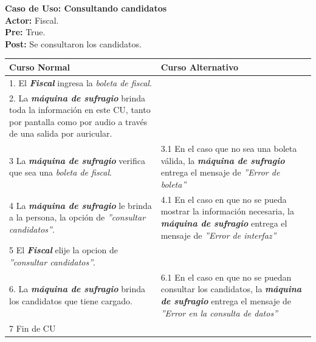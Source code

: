 \documentclass[spanish, 10pt,a4paper]{article}
\numberwithin{equation}{section} %
\begin{document}
\noindent\textbf{Caso de Uso: Consultando candidatos}\\
\textbf{Actor: } Fiscal.\\
\textbf{Pre: } True.\\
\textbf{Post: } Se consultaron los candidatos.\\
\begin{table}[H]
  \centering
\bgroup
\def\arraystretch{1.3}
  \begin{tabular}{p{9cm} | p{7cm}}
    \hline
    Curso Normal & Curso Alternativo \\
    \hline
    \hline    
    1. El \textbf{\textit{Fiscal}} ingresa la \textit{boleta de fiscal}. 
    & \\
    
    \hline
    2. La \textbf{\textit{máquina de sufragio}} brinda toda la información en este CU, tanto por pantalla como por audio a través de una salida por auricular.
    &
    \\
    
    \hline
    3 La \textbf{\textit{máquina de sufragio}} verifica que sea una \textit{boleta de fiscal}.
    & 
    3.1 En el caso que no sea una boleta válida, la \textbf{\textit{máquina de sufragio}} entrega el mensaje de \textit{''Error de boleta''}
    \\
    
    \hline
    4 La \textbf{\textit{máquina de sufragio}} le brinda a la persona, la opción de \textit{''consultar candidatos''}.
    & 
    4.1 En el caso en que no se pueda mostrar la información necesaria, la \textbf{\textit{máquina de sufragio}} entrega el mensaje de \textit{''Error de interfaz''}
    \\
    
    \hline
    5 El \textbf{\textit{Fiscal}} elije la opcion de \textit{''consultar candidatos''}.
    & \\
    
    \hline
    6. La \textbf{\textit{máquina de sufragio}} brinda los candidatos que tiene cargado.
    &
    6.1 En el caso en que no se puedan consultar los candidatos, la \textbf{\textit{máquina de sufragio}} entrega el mensaje de \textit{''Error en la consulta de datos''}
    \\
    
    \hline
    7 Fin de CU
    & \\
    \hline
  \end{tabular}
\egroup
\end{table}
\end{document}
